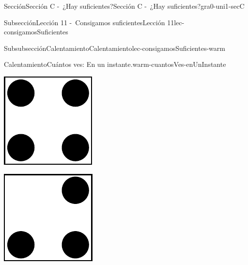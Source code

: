 \documentclass[twoside,10pt,]{article}
\begin{document}
\begin{sectionptx}{Sección}{Sección C -~¿Hay suficientes?}{}{Sección C -~¿Hay suficientes?}{}{}{gra0-uni1-secC}
\begin{subsectionptx}{Subsección}{Lección 11 -~Consigamos suficientes}{}{Lección 11}{}{}{lec-consigamosSuficientes}
\begin{subsubsectionptx}{Subsubsección}{Calentamiento}{}{Calentamiento}{}{}{lec-consigamosSuficientes-warm}
\begin{exploration}{Calentamiento}{Cuántos ves: En un instante.}{warm-cuantosVes-enUnInstante}
\begin{sidebyside}{2}{0}{0}{0}
\begin{sbspanel}{0.5}
\includegraphics[width=\linewidth]{external/svg-source/tikz-file-148153.pdf}
\end{sbspanel}%
\begin{sbspanel}{0.5}%
\includegraphics[width=\linewidth]{external/svg-source/tikz-file-136326.pdf}

\end{sbspanel}
\end{sidebyside}
\end{exploration}
\end{subsubsectionptx}
\end{subsectionptx}
\end{sectionptx}
\end{document}
